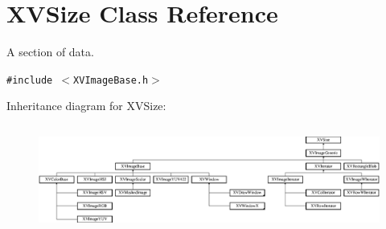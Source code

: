 \hypertarget{class_XVSize}{
\section{XVSize  Class Reference}
\label{XVSize}
}
A section of data. 


{\tt \#include $<$XVImage\-Base.h$>$}

Inheritance diagram for XVSize:\begin{figure}[H]
\begin{center}
\leavevmode
\includegraphics[height=3.57013cm]{class_XVSize}
\end{center}
\end{figure}
